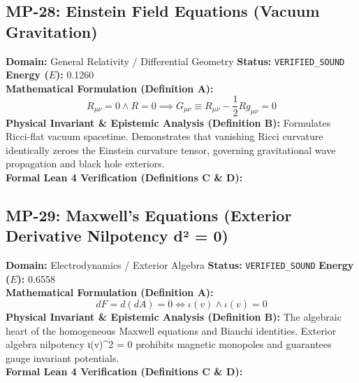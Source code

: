 \subsection{MP-28: Einstein Field Equations (Vacuum Gravitation)}
\textbf{Domain:} General Relativity / Differential Geometry \hfill \textbf{Status:} \texttt{VERIFIED\_SOUND} \hfill \textbf{Energy ($E$):} 0.1260\\
\textbf{Mathematical Formulation (Definition A):}
\begin{equation*}
R_{\mu\nu} = 0 \wedge R = 0 \implies G_{\mu\nu} \equiv R_{\mu\nu} - \frac{1}{2} R g_{\mu\nu} = 0
\end{equation*}
\textbf{Physical Invariant \& Epistemic Analysis (Definition B):}
Formulates Ricci-flat vacuum spacetime. Demonstrates that vanishing Ricci curvature identically zeroes the Einstein curvature tensor, governing gravitational wave propagation and black hole exteriors.\\

\textbf{Formal Lean 4 Verification (Definitions C \& D):}


\vspace{1em}
\subsection{MP-29: Maxwell's Equations (Exterior Derivative Nilpotency d² = 0)}
\textbf{Domain:} Electrodynamics / Exterior Algebra \hfill \textbf{Status:} \texttt{VERIFIED\_SOUND} \hfill \textbf{Energy ($E$):} 0.6558\\
\textbf{Mathematical Formulation (Definition A):}
\begin{equation*}
d F = d(d A) = 0 \iff \iota(v) \wedge \iota(v) = 0
\end{equation*}
\textbf{Physical Invariant \& Epistemic Analysis (Definition B):}
The algebraic heart of the homogeneous Maxwell equations and Bianchi identities. Exterior algebra nilpotency ι(v)\textasciicircum{}2 = 0 prohibits magnetic monopoles and guarantees gauge invariant potentials.\\

\textbf{Formal Lean 4 Verification (Definitions C \& D):}


\vspace{1em}
